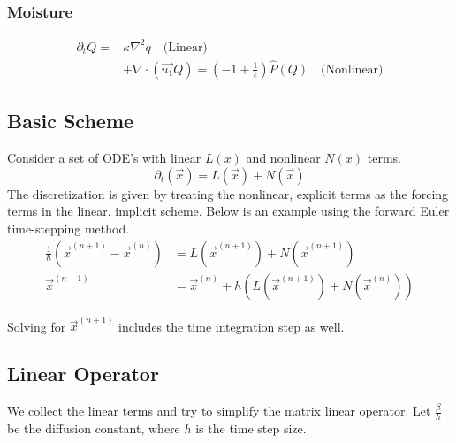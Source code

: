 \documentclass[10pt]{article}
\newcommand{\pd}[1]{\partial_{#1}}
\begin{document}
\subsubsection*{Moisture}
\begin{align*}
\pd{t} Q =& \kappa \nabla ^2 q \quad\text{(Linear)}\\
& + \nabla \cdot (\vec{u_1}Q) = \left(-1+\frac{1}{\epsilon}\right) \hat{P}(Q) \quad\text{(Nonlinear)}
\end{align*}

\subsection{Basic Scheme}
Consider a set of ODE's with linear $L(x)$  and nonlinear $N(x)$ terms.
\begin{equation}
\pd{t}(
\vec{x}) = L(\vec{x})+N(\vec{x}) 
\end{equation}
The discretization is given by treating the nonlinear, explicit terms as the forcing terms in the linear, implicit scheme. Below is an example using the forward Euler time-stepping method. 
\begin{align*}
\frac{1}{h}\left(\vec{x}^{(n+1)}-\vec{x}^{(n)}\right) &= L(\vec{x}^{(n+1)}) + N(\vec{x}^{(n+1)}) \\
\vec{x}^{(n+1)} &= \vec{x}^{(n)}+h\left(L(\vec{x}^{(n+1)}) + N(\vec{x}^{(n)}) \right)
\end{align*}

Solving for $\vec{x}^{(n+1)}$ includes the time integration step as well. 

\subsection{Linear Operator}
We collect the linear terms and try to simplify the matrix linear operator. 
Let $\frac{\beta}{h}$ be the diffusion constant, where $h$ is the time step size. 
\end{document}
